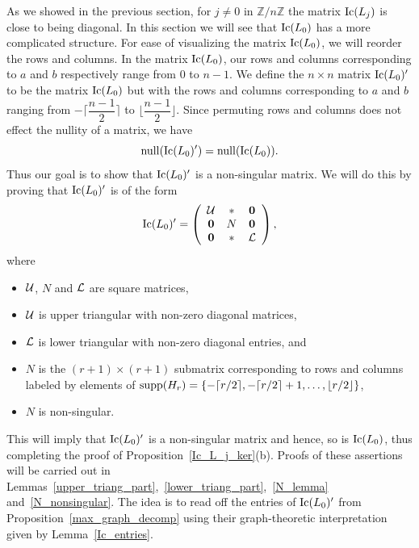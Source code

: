 \documentclass{amsproc}
\theoremstyle{definition}
\theoremstyle{remark}
\numberwithin{equation}{section}
\newcommand{\bbZ}{{\mathbb Z}}
\newcommand{\Ic}{{\rm Ic}}
\newcommand{\supp}{{\rm supp}}
\newcommand{\nullity}{{\rm null}}
\begin{document}
As we showed in the previous section, for $j \neq 0$ in $\bbZ/ n \bbZ$ the matrix $\Ic(L_j)$ is close to being diagonal. In this section we will see that
$\Ic(L_0)$ has a more complicated structure. 
For ease of visualizing the matrix $\Ic(L_0)$, we will reorder the rows and columns. In the matrix $\Ic(L_0)$, our rows and columns corresponding to $a$ and $b$ respectively range from $0$ to $n-1$. We define the $n\times n$ matrix $\Ic(L_0)'$ to be the matrix $\Ic(L_0)$ but with the rows and columns corresponding to $a$ and $b$ ranging from $-\lceil \dfrac{n-1}{2}\rceil$ to $\lfloor \dfrac{n-1}{2} \rfloor$. Since permuting rows and columns does not effect the nullity of a matrix, 
we have 
\[ \nullity(\Ic(L_0)')=\nullity(\Ic(L_0)). \]
Thus our goal is to show that $\Ic(L_0)'$ is a non-singular matrix.
We will do this by proving that $\Ic(L_0)'$ is of the form
\begin{equation}\label{Ic_L_0}
\Ic(L_0)'=\left(
\begin{array}{ccc}
\UT & \ast &{\bf 0}\\
{\bf 0}& N &{\bf 0}\\
{\bf 0}& \ast & \LT
\end{array}
\right),
\end{equation}
where 

\begin{itemize}
\item
$\mathcal{U}$, $N$ and $\mathcal{L}$ are square matrices,

\item
$\mathcal{U}$ is upper triangular with non-zero diagonal matrices, 

\item
$\mathcal{L}$ is lower triangular with non-zero diagonal entries, and

\item
$N$ is the $(r+1)\times (r+1)$ submatrix corresponding to rows and columns 
labeled by elements of $\supp(H_r) = \{ -\lceil r/2 \rceil,-\lceil r/2 \rceil+1,\dots,\lfloor r/2 \rfloor \}$,

\item
$N$ is non-singular.
\end{itemize}

This will imply that $\Ic(L_0)'$ is a non-singular matrix and hence, so is $\Ic(L_0)$, thus completing the proof of 
Proposition~\ref{Ic_L_j_ker}(b). Proofs of these assertions will be carried out in 
Lemmas~\ref{upper_triang_part},~\ref{lower_triang_part},~\ref{N_lemma} and~\ref{N_nonsingular}.
The idea is to read off the entries of $\Ic(L_0)'$ from Proposition~\ref{max_graph_decomp} using 
their graph-theoretic interpretation given by Lemma~\ref{Ic_entries}.
\end{document}
